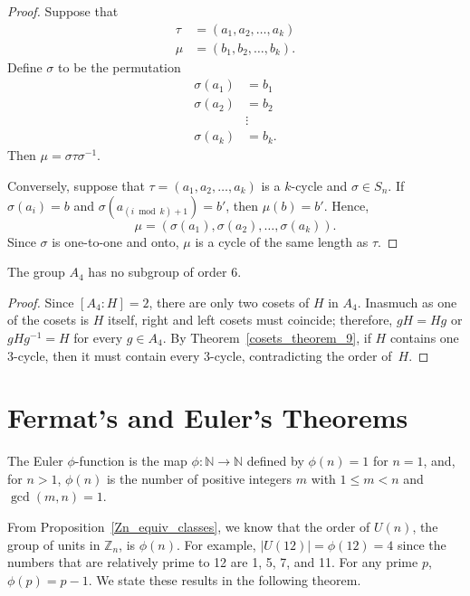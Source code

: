 \begin{proof}
Suppose that
\begin{align*}
\tau & = (a_1, a_2, \ldots, a_k ) \\
\mu  & = (b_1, b_2, \ldots, b_k ).
\end{align*}
Define $\sigma$ to be the permutation
\begin{align*}
\sigma( a_1 ) & = b_1 \\
\sigma( a_2 ) & = b_2 \\
& \vdots   \\
\sigma( a_k ) & = b_k.
\end{align*}
Then $\mu = \sigma \tau \sigma^{-1}$.

Conversely, suppose that $\tau = (a_1, a_2, \ldots, a_k )$ is a $k$-cycle and $\sigma \in S_n$. If $\sigma( a_i ) = b$ and $\sigma( a_{(i \bmod k) + 1} ) = b'$, then $\mu( b) = b'$.  Hence, 
\[
\mu = ( \sigma(a_1), \sigma(a_2), \ldots, \sigma(a_k) ).
\]
Since $\sigma$ is one-to-one and onto, $\mu$ is a cycle of the same length as $\tau$. 
\end{proof}

\begin{corollary}\label{cosets_theorem_10}
The group $A_4$ has no subgroup of order 6.
\end{corollary}

\begin{proof}
Since $[A_4 : H] = 2$, there are only two cosets of $H$ in $A_4$.  Inasmuch as one of the cosets is $H$ itself, right and left cosets must coincide; therefore, $gH = Hg$ or $g H g^{-1} = H$ for every $g \in A_4$.  By Theorem~\ref{cosets_theorem_9}, if $H$ contains one 3-cycle, then it must contain every 3-cycle, contradicting the order of~$H$. \hspace*{1in}
\end{proof}
 

\section{Fermat's and Euler's Theorems}

The {\bfi Euler} $\phi$-{\bfi function\/} is the map $\phi : {\mathbb N } \rightarrow {\mathbb N}$ defined by $\phi(n) = 1$ for $n=1$, and, for $n > 1$,  $\phi(n)$ is the number of positive integers $m$ with $1 \leq m < n$ and $\gcd(m,n) = 1$. 

From Proposition~\ref{Zn_equiv_classes}, we know that the order of $U(n)$, the group of units in ${\mathbb Z}_n$, is $\phi(n)$. For example, $|U(12)| = \phi(12)  = 4$ since the numbers that are relatively prime to 12 are 1, 5, 7, and 11. For any prime $p$, $\phi(p) = p-1$.  We state these results in the following theorem.

